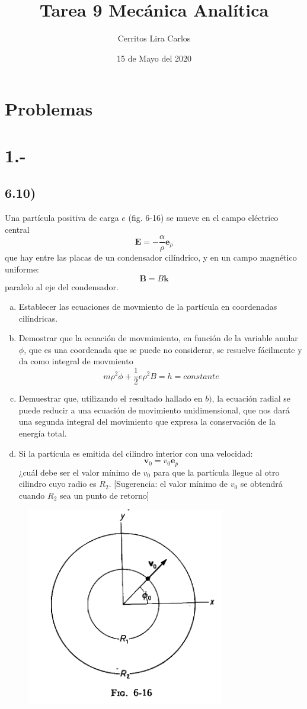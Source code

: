 \documentclass{article}
\title{Tarea 9 Mecánica Analítica}
\author{Cerritos Lira Carlos}
\date{15 de Mayo del 2020}
\begin{document}
\maketitle
\section*{Problemas}
\section*{1.-}
\subsection*{6.10)}
Una partícula positiva de carga $e$ (fig. 6-16) se mueve en el campo eléctrico central
\[ \bm{E} = -\frac{\alpha}{\rho} \bm{e}_{\rho} \]
que hay entre las placas de un condensador cilíndrico, y en un campo magnético uniforme:
\[ \bm{B} = B\bm{k} \]
paralelo al eje del condensador.
\begin{enumerate}[a)]
    \item Establecer las ecuaciones de movmiento de la partícula en coordenadas cilíndricas.
    \item Demostrar que la ecuación de movmimiento, en función de la variable anular $\phi$, que es 
    una coordenada que se puede no considerar, se resuelve fácilmente y da como integral de movmiento 
    \[ m\rho^2\dot{\phi} + \frac{1}{2}e\rho^2B = h = constante \]
    \item Demuestrar que, utilizando el resultado hallado en $b)$, la ecuación radial se puede 
    reducir a una ecuación de movimiento unidimensional, que nos dará una segunda integral del movimiento 
    que expresa la conservación de la energía total. 
    \item Si la partícula es emitida del cilindro interior con una velocidad:
    \[ \bm{v}_0 = v_0\bm{e}_p \]
    ¿cuál debe ser el valor mínimo de $v_0$ para que la partícula llegue al otro cilindro cuyo radio es $R_2$.
    [Sugerencia: el valor mínimo de $v_0$ se obtendrá cuando $R_2$ sea un punto de retorno]
\end{enumerate}
\begin{figure}[H]
    \centering
    \includegraphics[scale=0.6]{images/p1_diagram.png}
\end{figure}
\end{document}

